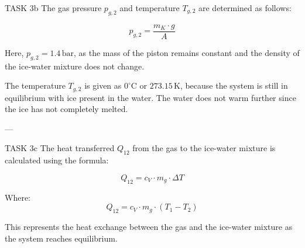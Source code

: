 TASK 3b  
The gas pressure \( p_{g,2} \) and temperature \( T_{g,2} \) are determined as follows:  

\[
p_{g,2} = \frac{m_K \cdot g}{A}
\]

Here, \( p_{g,2} = 1.4 \, \text{bar} \), as the mass of the piston remains constant and the density of the ice-water mixture does not change.  

The temperature \( T_{g,2} \) is given as \( 0^\circ\text{C} \) or \( 273.15 \, \text{K} \), because the system is still in equilibrium with ice present in the water. The water does not warm further since the ice has not completely melted.  

---

TASK 3c  
The heat transferred \( Q_{12} \) from the gas to the ice-water mixture is calculated using the formula:  

\[
Q_{12} = c_V \cdot m_g \cdot \Delta T
\]

Where:  
\[
Q_{12} = c_V \cdot m_g \cdot (T_1 - T_2)
\]  

This represents the heat exchange between the gas and the ice-water mixture as the system reaches equilibrium.